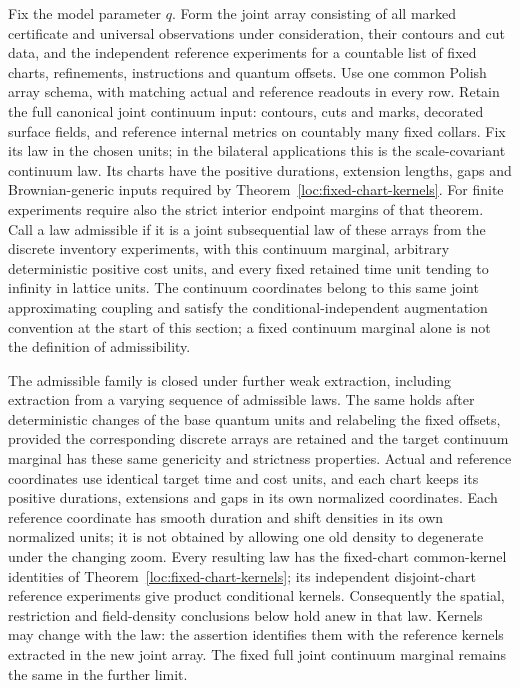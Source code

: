 \begin{proposition}
\label{loc:kernel-closure}
Fix the model parameter $q$.  Form the joint array consisting of all marked certificate and universal
observations under consideration, their contours and cut data, and the
independent reference experiments for a countable list of fixed charts,
refinements, instructions and quantum offsets.  Use one common Polish
array schema, with matching actual and reference readouts in every row.
Retain the full canonical
joint continuum input: contours, cuts and marks, decorated surface
fields, and reference internal metrics on countably many fixed collars.
Fix its law in the chosen units; in the bilateral applications this is
the scale-covariant continuum law.  Its charts have the positive
durations, extension lengths, gaps and Brownian-generic inputs required by
Theorem~\ref{loc:fixed-chart-kernels}.  For finite experiments require
also the strict interior endpoint margins of that theorem.
Call a law admissible if it is a joint
subsequential law of these arrays from the discrete inventory experiments,
with this continuum marginal, arbitrary deterministic positive cost
units, and every fixed retained time unit tending to infinity in lattice
units.  The continuum coordinates belong to this same joint approximating
coupling and satisfy the conditional-independent augmentation convention
at the start of this section; a fixed continuum marginal alone is not
the definition of admissibility.

The admissible family is closed under further weak extraction, including
extraction from a varying sequence of admissible laws.  The same holds
after deterministic changes of the base quantum units and relabeling the
fixed offsets, provided the corresponding discrete arrays are retained
and the target continuum marginal has these same genericity and strictness
properties.  Actual and reference coordinates use identical target time
and cost units, and each chart keeps its positive durations, extensions
and gaps in its own normalized coordinates.  Each reference coordinate has smooth duration and shift
densities in its own normalized units; it is not obtained by allowing one
old density to degenerate under the changing zoom.
Every resulting law has the fixed-chart common-kernel identities of
Theorem~\ref{loc:fixed-chart-kernels}; its independent disjoint-chart
reference experiments give product conditional kernels.  Consequently
the spatial, restriction and field-density conclusions below hold anew
in that law.  Kernels may change with the law: the assertion identifies
them with the reference kernels extracted in the new joint array.
The fixed full joint continuum marginal remains the same in the further
limit.
\end{proposition}
